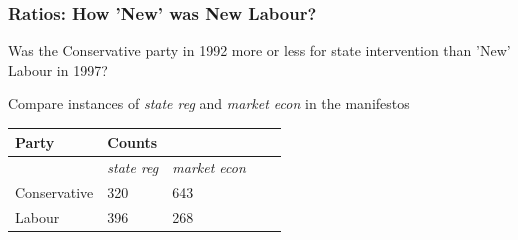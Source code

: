 \documentclass[11pt,compress,professionalfonts]{beamer}
\begin{document}
\begin{frame}[t]



\end{frame}
\begin{frame}[t]\frametitle{Ratios: How 'New' was New Labour?}

Was the Conservative party in 1992 more or less for state intervention than 'New' Labour in
1997?

Compare instances of \textsl{state reg} and \textsl{market econ} in the manifestos\\
\begin{center}
\begin{tabular}{lllll}\toprule
Party & \multicolumn{2}{l}{Counts}  \\ \midrule
& \textsl{state reg}    &    \textsl{market econ}  \\
Conservative  & 320   & 643 \\
Labour   & 396   & 268      \\ \bottomrule
\end{tabular}
\end{center}

\end{frame}
\end{document}
